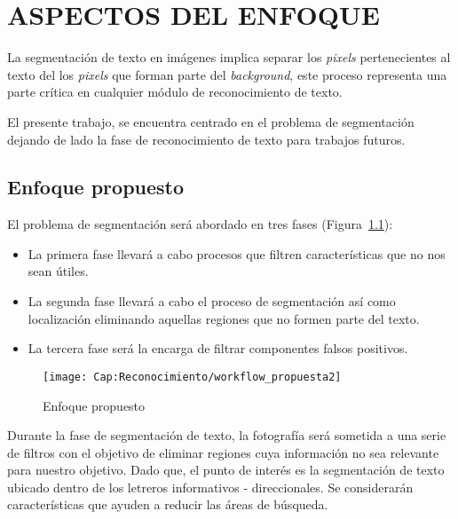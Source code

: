 \chapter{ASPECTOS DEL ENFOQUE}
\label{cap-aspectosenfoque}
\setcounter{secnumdepth}{0}

La segmentación de texto en imágenes implica separar los \textit{pixels} 
pertenecientes al texto del los \textit{pixels} que forman parte del
\textit{background}, este proceso representa una parte crítica en cualquier
módulo de reconocimiento de texto.

El presente trabajo, se encuentra centrado en el problema de segmentación 
dejando de lado la fase de reconocimiento de texto para trabajos futuros.

\setcounter{secnumdepth}{3}
\section{Enfoque propuesto}

El problema de segmentación será abordado en tres fases (Figura~\ref{fig:cap-reconocimiento:workflowenfoque}):
\begin{itemize}
	\item La primera fase llevará a cabo procesos que filtren características
	que no nos sean útiles.
	\item La segunda fase llevará a cabo el proceso de segmentación así como 
	localización eliminando aquellas regiones que no formen parte del texto.
	\item La tercera fase será la encarga de filtrar componentes falsos 
	positivos.
\end{itemize}

\begin{figure}[h!]
	\centering
	\texttt{[image: Cap:Reconocimiento/workflow\_propuesta2]}
	\caption{Enfoque propuesto}
	\label{fig:cap-reconocimiento:workflowenfoque}
\end{figure}

Durante la fase de segmentación de texto, la fotografía será sometida a una
serie de filtros con el objetivo de eliminar regiones cuya información no sea
relevante para nuestro objetivo. Dado que, el punto de interés es la
segmentación de texto ubicado dentro de los letreros informativos -
direccionales. Se considerarán características que ayuden a reducir las áreas 
de búsqueda. 

